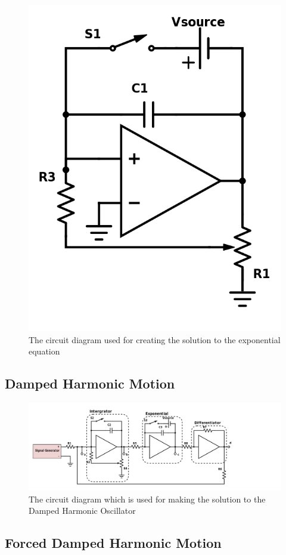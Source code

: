 \begin{figure}[ht!]
\centering
\includegraphics[scale=.33]{figures/460-17-4-Exponential.png}
\caption{The circuit diagram used for creating the solution to the exponential equation}
\label{fig:CD_Exp}
\end{figure}

\subsection{Damped Harmonic Motion}

\begin{figure}[ht!]
\centering
\includegraphics[scale=.4]{figures/460-17-6-Forced-HO.png}
\caption{The circuit diagram which is used for making the solution to the Damped Harmonic Oscillator}
\label{fig:CD_HO}
\end{figure}

\subsection{Forced Damped Harmonic Motion}